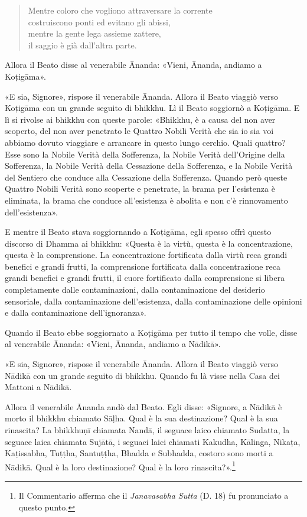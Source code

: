 \begin{quote}
Mentre coloro che vogliono attraversare la corrente \\
costruiscono ponti ed evitano gli abissi, \\
mentre la gente lega assieme zattere, \\
il saggio è già dall’altra parte.
\end{quote}


Allora il Beato disse al venerabile Ānanda: «Vieni, Ānanda, andiamo a Koṭigāma».

«E sia, Signore», rispose il venerabile Ānanda. Allora il Beato viaggiò verso
Koṭigāma con un grande seguito di bhikkhu. Lì il Beato soggiornò a Koṭigāma. E
lì si rivolse ai bhikkhu con queste parole: «Bhikkhu, è a causa del non aver
scoperto, del non aver penetrato le Quattro Nobili Verità che sia io sia voi
abbiamo dovuto viaggiare e arrancare in questo lungo cerchio. Quali quattro?
Esse sono la Nobile Verità della Sofferenza, la Nobile Verità dell’Origine della
Sofferenza, la Nobile Verità della Cessazione della Sofferenza, e la Nobile
Verità del Sentiero che conduce alla Cessazione della Sofferenza. Quando però
queste Quattro Nobili Verità sono scoperte e penetrate, la brama per l’esistenza
è eliminata, la brama che conduce all’esistenza è abolita e non c’è rinnovamento
dell’esistenza».

E mentre il Beato stava soggiornando a Koṭigāma, egli spesso offrì questo
discorso di Dhamma ai bhikkhu: «Questa è la virtù, questa è la concentrazione,
questa è la comprensione. La concentrazione fortificata dalla virtù reca grandi
benefici e grandi frutti, la comprensione fortificata dalla concentrazione reca
grandi benefici e grandi frutti, il cuore fortificato dalla comprensione si
libera completamente dalle contaminazioni, dalla contaminazione del desiderio
sensoriale, dalla contaminazione dell’esistenza, dalla contaminazione delle
opinioni e dalla contaminazione dell’ignoranza».


Quando il Beato ebbe soggiornato a Koṭigāma per tutto il tempo che volle, disse
al venerabile Ānanda: «Vieni, Ānanda, andiamo a Nādikā».

«E sia, Signore», rispose il venerabile Ānanda. Allora il Beato viaggiò verso
Nādikā con un grande seguito di bhikkhu. Quando fu là visse nella Casa dei
Mattoni a Nādikā.

Allora il venerabile Ānanda andò dal Beato. Egli disse: «Signore, a Nādikā è
morto il bhikkhu chiamato Sāḷha. Qual è la sua destinazione? Qual è la sua
rinascita? La bhikkhuṇī chiamata Nandā, il seguace laico chiamato Sudatta, la
seguace laica chiamata Sujātā, i seguaci laici chiamati Kakudha, Kālinga,
Nikaṭa, Kaṭissabha, Tuṭṭha, Santuṭṭha, Bhadda e Subhadda, costoro sono morti a
Nādikā. Qual è la loro destinazione? Qual è la loro rinascita?».\footnote{Il
  Commentario afferma che il \emph{Janavasabha Sutta} (D. 18) fu pronunciato a
  questo punto.}

